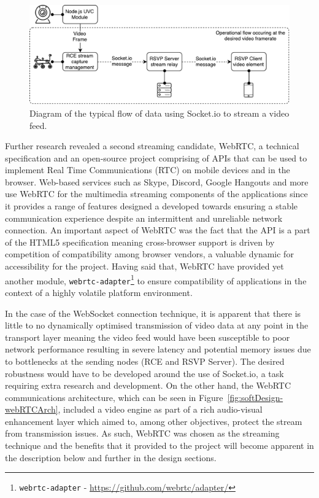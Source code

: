       \begin{figure}[h!]
        \centering
        \includegraphics[width=0.8\linewidth]{figures/softDesign-socketVideoStreaming}
        \caption[Diagram of the typical flow of data using Socket.io to stream a video feed.]{Diagram of the typical flow of data using Socket.io to stream a video feed.}
        \label{fig:softDesign-socketVideoStreaming}
      \end{figure}
      
      Further research revealed a second streaming candidate, WebRTC, a technical specification and an open-source project comprising of APIs that can be used to implement Real Time Communications (RTC) on mobile devices and in the browser. Web-based services such as Skype, Discord, Google Hangouts and more use WebRTC for the multimedia streaming components of the applications since it provides a range of features designed a developed towards ensuring a stable communication experience despite an intermittent and unreliable network connection. An important aspect of WebRTC was the fact that the API is a part of the HTML5 specification meaning cross-browser support is driven by competition of compatibility among browser vendors, a valuable dynamic for accessibility for the project. Having said that, WebRTC have provided yet another module, \texttt{webrtc-adapter}\footnote{\texttt{webrtc-adapter} - \url{https://github.com/webrtc/adapter/}} to ensure compatibility of applications in the context of a highly volatile platform environment.
      
      In the case of the WebSocket connection technique, it is apparent that there is little to no dynamically optimised transmission of video data at any point in the transport layer meaning the video feed would have been susceptible to poor network performance resulting in severe latency and potential memory issues due to bottlenecks at the sending nodes (RCE and RSVP Server). The desired robustness would have to be developed around the use of Socket.io, a task requiring extra research and development. On the other hand, the WebRTC communications architecture, which can be seen in Figure~\ref{fig:softDesign-webRTCArch}, included a video engine as part of a rich audio-visual enhancement layer which aimed to, among other objectives, protect the stream from transmission issues. As such, WebRTC was chosen as the streaming technique and the benefits that it provided to the project will become apparent in the description below and further in the design sections.
      

